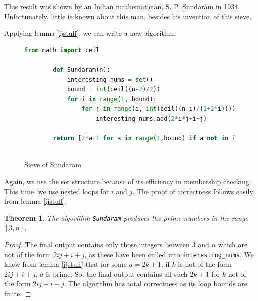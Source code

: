 \documentclass{amsart}
\newtheorem{thm}{Theorem}
\theoremstyle{definition}
\theoremstyle{case}
\begin{document}
	This result was shown by an Indian mathematician, S. P. Sundaram in 1934. Unfortunately, little is known about this man, besides his invention of this sieve. 
	
	Applying lemma \ref{ijstuff}, we can write a new algorithm.

	\begin{figure}[H]\caption{Sieve of Sundaram}
		\begin{lstlisting}[language=Python]
		from math import ceil
		
		def Sundaram(n):
		    interesting_nums = set()
		    bound = int(ceil((n-2)/2))
		    for i in range(1, bound):
		        for j in range(i, int(ceil((n-i)/(1+2*i)))):
		            interesting_nums.add(2*i*j+i+j)
		
		return [2*a+1 for a in range(1,bound) if a not in interesting_nums]
		
		\end{lstlisting}
	\end{figure}

	Again, we use the set structure because of its efficiency in membership checking. This time, we use nested loops for $i$ and $j$. The proof of correctness follows easily from lemma \ref{ijstuff}.
	
	\begin{thm}
		The algorithm \texttt{Sundaram} produces the prime numbers in the range $[3, n]$.
	\end{thm}
	\begin{proof}
		The final output contains only those integers between $3$ and $n$ which are not of the form $2ij+i+j$, as these have been culled into \texttt{interesting\_nums}. We know from lemma \ref{ijstuff} that for some $a=2k+1$, if $k$ is not of the form $2ij+i+j$, $a$ is prime. So, the final output contains all such $2k+1$ for $k$ not of the form $2ij+i+j$. The algorithm has total correctness as its loop bounds are finite.
	\end{proof}
	
\end{document}
